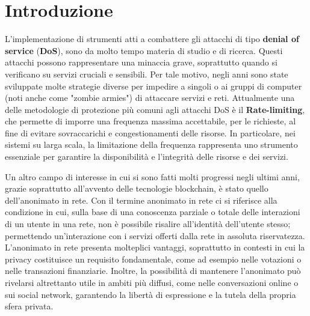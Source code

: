 \chapter*{Introduzione}
\label{chap:introduction}

L’implementazione di strumenti atti a combattere gli attacchi di tipo \textbf{denial of service} (\textbf{DoS}), sono da molto
tempo materia di studio e di ricerca. Questi attacchi possono rappresentare una minaccia grave, soprattutto quando si
verificano su servizi cruciali e sensibili. Per tale motivo, negli anni sono state sviluppate molte strategie diverse
per impedire a singoli o ai gruppi di computer (noti anche come "zombie armies") di attaccare servizi e reti.
Attualmente una delle metodologie di protezione più comuni agli attacchi DoS è il \textbf{Rate-limiting}, che permette
di imporre una frequenza massima accettabile, per le richieste, al fine di evitare sovraccarichi e congestionamenti delle
risorse. In particolare, nei sistemi su larga scala, la limitazione della frequenza rappresenta uno strumento essenziale
per garantire la disponibilità e l'integrità delle risorse e dei servizi.

Un altro campo di interesse in cui si sono fatti molti progressi negli ultimi anni, grazie soprattutto all'avvento delle
tecnologie blockchain, è stato quello dell’anonimato in rete. Con il termine anonimato in rete ci si riferisce alla
condizione in cui, sulla base di una conoscenza parziale o totale delle interazioni di un utente in una rete, non è
possibile risalire all'identità dell'utente stesso; permettendo un'interazione con i servizi offerti dalla rete in
assoluta riservatezza. L'anonimato in rete presenta molteplici vantaggi, soprattutto in contesti in cui la privacy
costituisce un requisito fondamentale, come ad esempio nelle votazioni o nelle transazioni finanziarie. Inoltre, la
possibilità di mantenere l'anonimato può rivelarsi altrettanto utile in ambiti più diffusi, come nelle conversazioni online
o sui social network, garantendo la libertà di espressione e la tutela della propria sfera privata.

